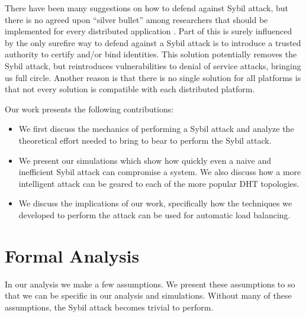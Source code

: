 \documentclass[11pt,conference]{IEEEtran}
\begin{document}
There have been many suggestions on how to defend against Sybil attack, but there is no agreed upon ``silver bullet'' among researchers that should be implemented for every distributed application \cite{levine2006survey} \cite{dhtsec}.
Part of this is surely influenced by the only surefire way to defend against a Sybil attack is to introduce a trusted authority to certify and/or bind identities.
This solution potentially removes the Sybil attack, but reintroduces vulnerabilities to denial of service attacks, bringing us full circle.
Another reason is that there is no single solution for all platforms is that not every solution is compatible with each distributed platform.



Our work presents the following contributions:
\begin{itemize}
    \item We first discuss the mechanics of performing a Sybil attack and analyze the theoretical effort needed to bring to bear to perform the Sybil attack.
    \item We present our simulations which show how quickly even a naive and inefficient Sybil attack can compromise a system.  We also discuss how a more intelligent attack can be geared to each of the more popular DHT topologies.
    \item We discuss the implications of our work, specifically how the techniques we developed to perform the attack can be used for automatic load balancing.

\end{itemize}

\section{Formal Analysis}

In our analysis we make a few assumptions. 
We present these assumptions to so that we can be specific in our analysis and simulations.
Without many of these assumptions, the Sybil attack becomes trivial to perform.
\end{document}
